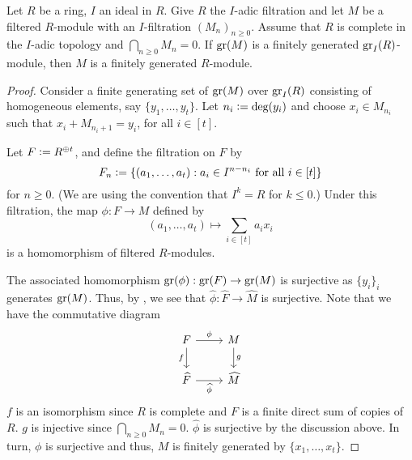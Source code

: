 \begin{thm} \label{thm:gr-M-finite-implies-M-finite}
	Let $R$ be a ring, $I$ an ideal in $R$. Give $R$ the $I$-adic filtration and let $M$ be a filtered $R$-module with an $I$-filtration $(M_{n})_{n \ge 0}$. \newline
	Assume that $R$ is complete in the $I$-adic topology and $\bigcap_{n \ge 0} M_{n} = 0$. If $\operatorname{gr}(M)$ is a finitely generated $\operatorname{gr}_{I}(R)$-module, then $M$ is a finitely generated $R$-module.
\end{thm}
\begin{proof} 
	Consider a finite generating set of $\operatorname{gr}(M)$ over $\operatorname{gr}_{I}(R)$ consisting of homogeneous elements, say $\{y_{1}, \ldots, y_{t}\}$. Let $n_{i} \vcentcolon= \deg(y_{i})$ and choose $x_{i} \in M_{n_{i}}$ such that $x_{i} + M_{n_{i} + 1} = y_{i}$, for all $i \in [t]$. 

	Let $F \vcentcolon= R^{\oplus t}$, and define the filtration on $F$ by
	\begin{equation*} 
		F_{n} \vcentcolon= \{(a_{1}, \ldots, a_{t}) : a_{i} \in I^{n - n_{i}} \text{ for all $i \in [t]$}\}
	\end{equation*}
	for $n \ge 0$. (We are using the convention that $I^{k} = R$ for $k \le 0$.) Under this filtration, the map $\phi : F \to M$ defined by
	\begin{equation*} 
		(a_{1}, \ldots, a_{t}) \mapsto \sum_{i \in [t]} a_{i} x_{i}
	\end{equation*}
	is a homomorphism of filtered $R$-modules.

	The associated homomorphism $\operatorname{gr}(\phi) : \operatorname{gr}(F) \to \operatorname{gr}(M)$ is surjective as $\{y_{i}\}_{i}$ generates $\operatorname{gr}(M)$. Thus, by , we see that $\widehat{\phi} : \widehat{F} \to \widehat{M}$ is surjective. Note that we have the commutative diagram
	\begin{equation*} 
		\begin{tikzcd}
			F \arrow[d, "f"'] \arrow[r, "\phi"] & M \arrow[d, "g"] \\
			\widehat{F} \arrow[r, "\widehat{\phi}"'] & \widehat{M}
		\end{tikzcd}
	\end{equation*}
	$f$ is an isomorphism since $R$ is complete and $F$ is a finite direct sum of copies of $R$. $g$ is injective since $\bigcap_{n \ge 0} M_{n} = 0$. $\widehat{\phi}$ is surjective by the discussion above. In turn, $\phi$ is surjective and thus, $M$ is finitely generated by $\{x_{1}, \ldots, x_{t}\}$.
\end{proof}

